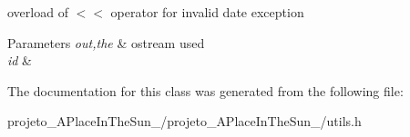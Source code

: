 overload of $<$$<$ operator for invalid date exception 


\begin{DoxyParams}{Parameters}
{\em out,the} & ostream used\\
\hline
{\em id} & \\
\hline
\end{DoxyParams}


The documentation for this class was generated from the following file\+:\begin{DoxyCompactItemize}
\item 
projeto\+\_\+\+A\+Place\+In\+The\+Sun\+\_/projeto\+\_\+\+A\+Place\+In\+The\+Sun\+\_/utils.\+h\end{DoxyCompactItemize}
